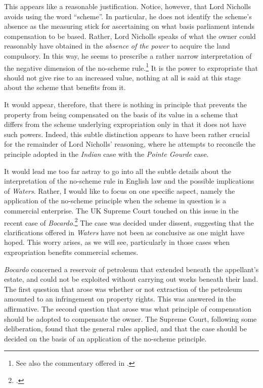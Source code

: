 This appears like a reasonable justification. Notice, however, that Lord Nicholls avoids using the word ``scheme''. In particular, he does not identify the scheme's absence as the measuring stick for ascertaining on what basis parliament intends compensation to be based. Rather, Lord Nicholls speaks of what the owner could reasonably have obtained in the \emph{absence of the power} to acquire the land compulsory. In this way, he seems to prescribe a rather narrow interpretation of the negative dimension of the no-scheme rule.\footnote{See also the commentary offered in \cite{newuk}.} It is the power to expropriate that should not give rise to an increased value, nothing at all is said at this stage about the scheme that benefits from it.

It would appear, therefore, that there is nothing in principle that prevents the property from being compensated on the basis of its value in a scheme that differs from the scheme underlying expropriation only in that it does not have such powers. Indeed, this subtle distinction appears to have been rather crucial for the remainder of Lord Nicholls' reasoning, where he attempts to reconcile the principle adopted in the \emph{Indian} case with the \emph{Pointe Gourde} case.

It would lead me too far astray to go into all the subtle details about the interpretation of the no-scheme rule in English law and the possible implications of \emph{Waters}. Rather, I would like to focus on one specific aspect, namely the application of the no-scheme principle when the scheme in question is a commercial enterprise. The UK Supreme Court touched on this issue in the recent case of  \emph{Bocardo}.\footnote{\cite{bocardo10}.} The case was decided under dissent, suggesting that the clarifications offered in \emph{Waters} have not been as conclusive as one might have hoped. This worry arises, as we will see, particularly in those cases when expropriation benefits commercial schemes.

\emph{Bocardo} concerned a reservoir of petroleum that extended beneath the appellant's estate, and could not be exploited without carrying out works beneath their land. The first question that arose was whether or not extraction of the petroleum amounted to an infringement on property rights. This was answered in the affirmative. The second question that arose was what principle of compensation should be adopted to compensate the owner. The Supreme Court, following some deliberation, found that the general rules applied, and that the case should be decided on the basis of an application of the no-scheme principle.


